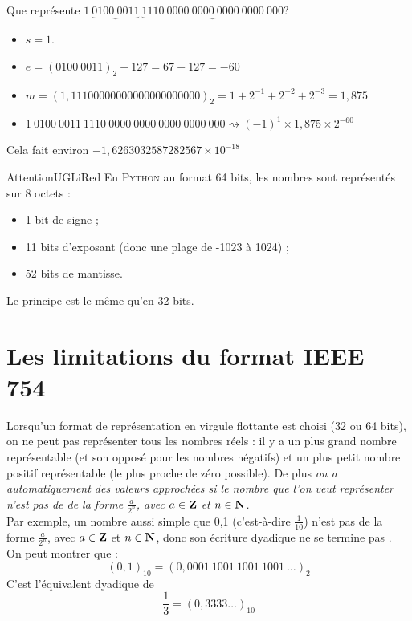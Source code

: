 \begin{exemple}
    Que représente $1\ \underbrace{0100\ 0011}\ \underbrace{1110\ 0000\ 0000\ 0000\ 0000\ 000}$?
    \begin{itemize}
        \item $s = 1$.
        \item $e =(0100\ 0011)_2-127=67-127=-60$
        \item $m= (\boxed{1},1110 0000 0000 0000 0000 000)_2=1+2^{-1}+2^{-2}+2^{-3}=1,875$
        \item $1\ 0100\ 0011\ 1110\ 0000\ 0000\ 0000\ 0000\ 000\rightsquigarrow (-1)^1\times 1,875\times 2^{-60}$
    \end{itemize}
    Cela fait environ $-1,6263032587282567\times 10^{-18}$
\end{exemple}

\begin{encadrecolore}{Attention}{UGLiRed}
    En \textsc{Python} au format 64 bits, les nombres sont représentés sur 8 octets :
    \begin{itemize}
        \item 1 bit de signe ;
        \item 11 bits d'exposant (donc une plage de -1023 à 1024) ;
        \item 52 bits de mantisse.
    \end{itemize}
    Le principe est le même qu'en 32 bits.
\end{encadrecolore}

\section{Les limitations du format IEEE 754}


Lorsqu'un format de représentation en virgule flottante est choisi (32 ou 64 bits), on ne peut pas représenter tous les nombres réels : il y a un
plus grand nombre représentable (et son opposé pour les nombres négatifs) et un \og plus petit nombre positif représentable\fg{} (le plus proche de
zéro possible). De plus \textit{ on a automatiquement des valeurs approchées si le nombre que l'on veut représenter n'est pas de de la forme $\frac{a}{2^n}$, avec $a\in\mathbf{Z}$ et $n\in\mathbf{N}$.}\\

Par exemple, un nombre aussi simple que 0,1 (c'est-à-dire $\frac{1}{10}$) n'est pas de la forme $\frac{a}{2^n}$, avec $a\in\mathbf{Z}$ et $n\in\mathbf{N}$, donc son
écriture dyadique ne se termine pas .\\
On peut montrer que :$$(0,1)_{10} = (0,0001\ 1001\ 1001\ 1001\ \ldots)_2$$
C'est l'équivalent dyadique de $$\dfrac{1}{3}=(0,3333\ldots)_{10}$$

